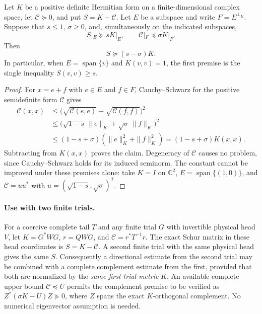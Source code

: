 \begin{proposition}
\label{prop:v126-direction-complement}
Let $K$ be a positive definite Hermitian form on a finite-dimensional
complex space, let $\mathcal C\succeq0$, and put $S=K-\mathcal C$.
Let $E$ be a subspace and write $F=E^{\perp_K}$.
Suppose that $s\leq1$, $\sigma\geq0$, and, simultaneously on the
indicated subspaces,
\[
 S|_E\succeq sK|_E,
 \qquad \mathcal C|_F\preceq\sigma K|_F.
\]
Then
\[
 S\succeq(s-\sigma)K.
\]
In particular, when $E=\operatorname{span}\{v\}$ and $K(v,v)=1$,
the first premise is the single inequality $S(v,v)\geq s$.
\end{proposition}
\begin{proof}
For $x=e+f$ with $e\in E$ and $f\in F$, Cauchy--Schwarz for the
positive semidefinite form $\mathcal C$ gives
\begin{align*}
 \mathcal C(x,x)
 &\leq\bigl(\sqrt{\mathcal C(e,e)}+
                 \sqrt{\mathcal C(f,f)}\bigr)^2\\
 &\leq\bigl(\sqrt{1-s}\,\|e\|_K+
                 \sqrt{\sigma}\,\|f\|_K\bigr)^2\\
 &\leq(1-s+\sigma)(\|e\|_K^2+\|f\|_K^2)
  =(1-s+\sigma)K(x,x).
\end{align*}
Subtracting from $K(x,x)$ proves the claim.  Degeneracy of
$\mathcal C$ causes no problem, since Cauchy--Schwarz holds for
its induced seminorm.  The constant cannot be improved under
these premises alone: take $K=I$ on $\mathbb C^2$,
$E=\operatorname{span}\{(1,0)\}$, and
$\mathcal C=uu^*$ with $u=(\sqrt{1-s},\sqrt{\sigma})^T$.
\end{proof}

\paragraph{Use with two finite trials.}
For a coercive complete tail $T$ and any finite trial $G$ with
invertible physical head $V$, let
$K=G^*WG$, $r=QWG$, and $\mathcal C=r^*T^{-1}r$.
The exact Schur matrix in these head coordinates is $S=K-\mathcal C$.
A second finite trial with the same physical head gives the same $S$.
Consequently a directional estimate from the second trial may be combined
with a complete complement estimate from the first, provided that both
are normalized by the \emph{same first-trial metric} $K$.
An available complete upper bound $\mathcal C\preceq U$ permits the
complement premise to be verified as
$Z^*(\sigma K-U)Z\succeq0$, where $Z$ spans the exact
$K$-orthogonal complement.  No numerical eigenvector assumption is needed.
